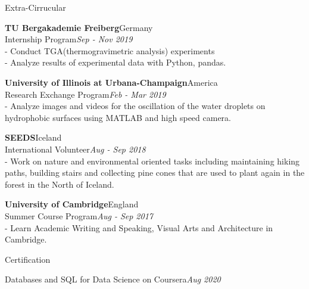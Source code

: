 \documentclass{resume} %
\begin{document}
\begin{rSection}{Extra-Cirrucular} 
\item {\bf TU Bergakademie Freiberg}\hfill {Germany}\\Internship Program\hfill {\em Sep - Nov 2019}\\- Conduct TGA(thermogravimetric analysis) experiments\\- Analyze results of experimental data with Python, pandas.
\item {\bf University of Illinois at Urbana-Champaign}\hfill {America}\\Research Exchange Program\hfill {\em Feb - Mar 2019}\\- Analyze images and videos for the oscillation of the water droplets on hydrophobic surfaces using MATLAB and high speed camera.
\item {\bf SEEDS}\hfill {Iceland}\\International Volunteer\hfill {\em Aug - Sep 2018}\\- Work on nature and environmental oriented tasks including maintaining hiking paths, building stairs and collecting pine cones that are used to plant again in the forest in the North of Iceland.
\item {\bf University of Cambridge}\hfill {England}\\Summer Course Program\hfill {\em Aug - Sep 2017}\\- Learn Academic Writing and Speaking, Visual Arts and Architecture in Cambridge.
\end{rSection}


\begin{rSection}{Certification}
 \item Databases and SQL for Data Science on Coursera\hfill {\em Aug 2020}
\end{rSection}
\end{document}
